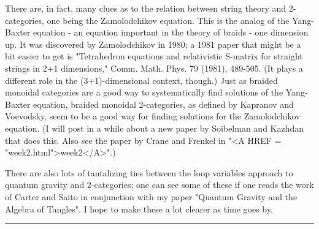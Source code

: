 There are, in fact, many clues as to the relation between string theory
and 2-categories, one being the Zamolodchikov equation.  This is the 
analog of the Yang-Baxter equation - an equation important in the theory
of braids - one dimension up.  It was discovered by Zamolodchikov in
1980; a 1981 paper that might be a bit easier to get is "Tetrahedron
equations and relativistic S-matrix for straight strings in 2+1
dimensions," Comm. Math. Phys. 79 (1981), 489-505.   (It plays a
different role in the (3+1)-dimensional context, though.)  Just as
braided monoidal categories are a good way to systematically find
solutions of the Yang-Baxter equation, braided monoidal 2-categories,
as defined by Kapranov and Voevodsky, seem to be a good way for finding
solutions for the Zamolodchikov equation.   (I will post in a while
about a new paper by Soibelman and Kazhdan that does this.  Also see the
paper by Crane and Frenkel in "<A HREF = "week2.html">week2</A>".)  

There are also lots of tantalizing ties between the loop variables approach
to quantum gravity and 2-categories; one can see some of these if one
reads the work of Carter and Saito in conjunction with my paper "Quantum
Gravity and the Algebra of Tangles".  I hope to make these a lot clearer
as time goes by.
\par\noindent\rule{\textwidth}{0.4pt}


